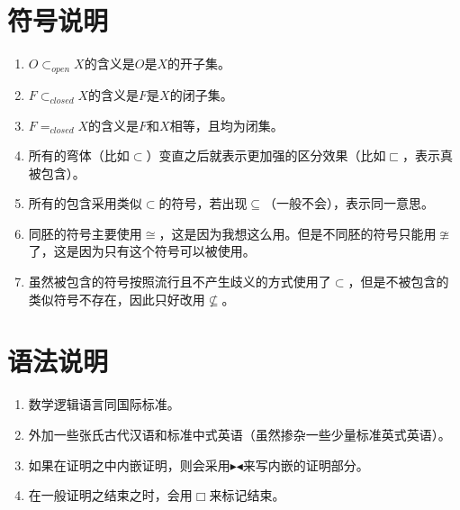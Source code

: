 \documentclass[lang=cn,10pt,device=pad]{elegantbook}
\newcommand{\kaiti}{\CJKfamily{kaiti}}%
\begin{document}
\section{符号说明}
\begin{enumerate}
	\item $O\subset_{open}X$的含义是$O$是$X$的开子集。
	\item $F\subset_{closed}X$的含义是$F$是$X$的闭子集。
	\item $F=_{closed}X$的含义是$F$和$X$相等，且均为闭集。
	\item 所有的弯体（比如$\subset$）变直之后就表示更加强的区分效果（比如$\sqsubset$，表示真被包含）。
	\item 所有的包含采用类似$\subset$的符号，若出现$\subseteq$（一般不会），表示同一意思。
	\item 同胚的符号主要使用$\cong$，这是因为我想这么用。但是不同胚的符号只能用$\ncong$了，这是因为只有这个符号可以被使用。
	\item 虽然被包含的符号按照流行且不产生歧义的方式使用了$\subset$，但是不被包含的类似符号不存在，因此只好改用$\nsubseteq$。
\end{enumerate}
\section{语法说明}
\begin{enumerate}
	\item 数学逻辑语言同国际标准。
	\item 外加一些张氏古代汉语和标准中式英语（虽然掺杂一些少量标准英式英语）。
	\item 如果在证明之中内嵌证明，则会采用$\blacktriangleright${\kaiti{证明}}$\blacktriangleleft$来写内嵌的证明部分。
	\item 在一般证明之结束之时，会用$\Box$来标记结束。
\end{enumerate}

\printindex
\end{document}
